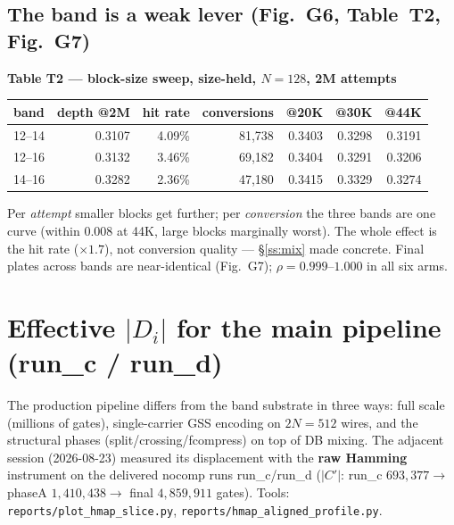 \documentclass[11pt]{article}
\newcommand{\code}[1]{\texttt{#1}}
\newcommand{\Di}{\lvert D_i\rvert}
\begin{document}
\subsection{The band is a weak lever (Fig.~G6, Table~T2, Fig.~G7)}
\begin{center}\small
\textbf{Table T2 --- block-size sweep, size-held, $N{=}128$, 2M attempts}\\[3pt]
\begin{tabular}{lrrrrrr}
\toprule
band & depth @2M & hit rate & conversions & @20K & @30K & @44K\\
\midrule
12--14 & 0.3107 & 4.09\% & 81{,}738 & 0.3403 & 0.3298 & 0.3191\\
12--16 & 0.3132 & 3.46\% & 69{,}182 & 0.3404 & 0.3291 & 0.3206\\
14--16 & 0.3282 & 2.36\% & 47{,}180 & 0.3415 & 0.3329 & 0.3274\\
\bottomrule
\end{tabular}
\end{center}
Per \emph{attempt} smaller blocks get further; per \emph{conversion} the three bands are one curve
(within 0.008 at 44K, large blocks marginally worst). The whole effect is the hit rate ($\times1.7$),
not conversion quality --- \S\ref{ss:mix} made concrete. Final plates across bands are near-identical
(Fig.~G7); $\rho=0.999$--$1.000$ in all six arms.

\section{Effective $\Di$ for the main pipeline (run\_c / run\_d)}
The production pipeline differs from the band substrate in three ways: full scale (millions of gates),
single-carrier GSS encoding on $2N{=}512$ wires, and the structural phases (split/crossing/fcompress)
on top of DB mixing. The adjacent session (2026-08-23) measured its displacement with the \textbf{raw
Hamming} instrument on the delivered nocomp runs run\_c/run\_d ($|C'|$: run\_c $693{,}377\to$ phaseA
$1{,}410{,}438\to$ final $4{,}859{,}911$ gates). Tools: \code{reports/plot\_hmap\_slice.py},
\code{reports/hmap\_aligned\_profile.py}.
\end{document}
